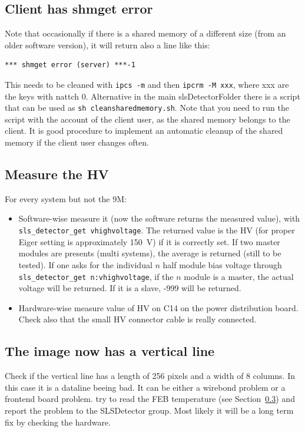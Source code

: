 \documentclass{article}
\begin{document}
\subsection{Client has \textbf{shmget error}}
Note that occasionally if there is a shared memory of a different size (from an older software version), it will return also a line like this:
\begin{verbatim}
*** shmget error (server) ***-1
\end{verbatim}
This needs to be cleaned with {\tt{ipcs -m}} and then {\tt{ipcrm -M xxx}}, where xxx are the keys with nattch 0. Alternative in the main slsDetectorFolder there is a script that can be used as {\tt{sh cleansharedmemory.sh}}. Note that you need to run the script with the account of the client user, as the shared memory belongs to the client. It is good procedure to implement an automatic cleanup of the shared memory if the client user changes often.   

\subsection{Measure the HV}
For every system but not the 9M: 
\begin{itemize}
\item Software-wise measure it (now the software returns the measured value), with {\tt{sls\_detector\_get vhighvoltage}}. The returned value is the HV (for proper Eiger setting is approximately 150~V) if it is correctly set. If two master modules are presents (multi systems), the average is returned (still to be tested). If one asks for the individual $n$ half module bias voltage through {\tt{sls\_detector\_get n:vhighvoltage}}, if the $n$ module is a master, the actual voltage will be returned. If it is a slave, -999 will be returned. 
\item Hardware-wise measure value of HV on C14 on the power distribution board. Check also that the small HV connector cable is really connected. 
 \end{itemize}

\subsection{The image now has a vertical line}
Check if the vertical line has a length of 256 pixels and a width of 8 columns. In this case it is a dataline beeing bad. It can be either a wirebond problem or a frontend board problem. try to read the FEB temperature (see Section~\ref{}) and report the problem to the SLSDetector group. Most likely it will be a long term fix by checking the hardware.
\end{document}
